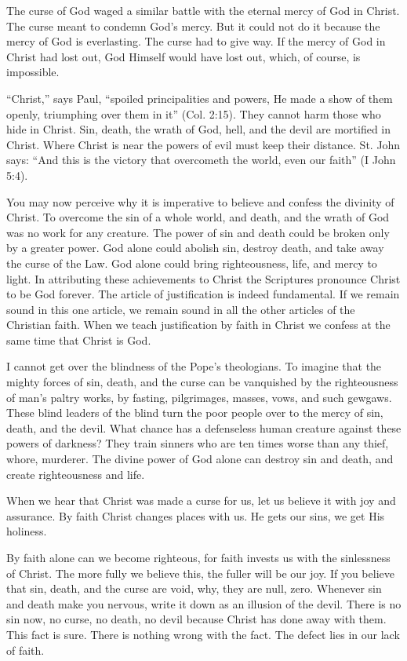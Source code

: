 The curse of God waged a similar battle with the eternal mercy of God in Christ. The curse meant to condemn God’s mercy. But it could not do it because the mercy of God is everlasting. The curse had to give way. If the mercy of God in Christ had lost out, God Himself would have lost out, which, of course, is impossible.

“Christ,” says Paul, “spoiled principalities and powers, He made a show of them openly, triumphing over them in it” (Col. 2:15). They cannot harm those who hide in Christ. Sin, death, the wrath of God, hell, and the devil are mortified in Christ. Where Christ is near the powers of evil must keep their distance. St. John says: “And this is the victory that overcometh the world, even our faith” (I John 5:4).

You may now perceive why it is imperative to believe and confess the divinity of Christ. To overcome the sin of a whole world, and death, and the wrath of God was no work for any creature. The power of sin and death could be broken only by a greater power. God alone could abolish sin, destroy death, and take away the curse of the Law. God alone could bring righteousness, life, and mercy to light. In attributing these achievements to Christ the Scriptures pronounce Christ to be God forever. The article of justification is indeed fundamental. If we remain sound in this one article, we remain sound in all the other articles of the Christian faith. When we teach justification by faith in Christ we confess at the same time that Christ is God.

I cannot get over the blindness of the Pope’s theologians. To imagine that the mighty forces of sin, death, and the curse can be vanquished by the righteousness of man’s paltry works, by fasting, pilgrimages, masses, vows, and such gewgaws. These blind leaders of the blind turn the poor people over to the mercy of sin, death, and the devil. What chance has a defenseless human creature against these powers of darkness? They train sinners who are ten times worse than any thief, whore, murderer. The divine power of God alone can destroy sin and death, and create righteousness and life.

When we hear that Christ was made a curse for us, let us believe it with joy and assurance. By faith Christ changes places with us. He gets our sins, we get His holiness.

By faith alone can we become righteous, for faith invests us with the sinlessness of Christ. The more fully we believe this, the fuller will be our joy. If you believe that sin, death, and the curse are void, why, they are null, zero. Whenever sin and death make you nervous, write it down as an illusion of the devil. There is no sin now, no curse, no death, no devil because Christ has done away with them. This fact is sure. There is nothing wrong with the fact. The defect lies in our lack of faith.


